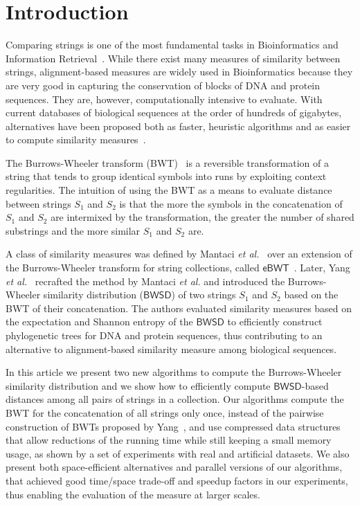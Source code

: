 \documentclass{elsarticle}
\newcommand{\EBWT}{\ensuremath{\mathsf{eBWT}}\xspace}
\newcommand{\etal}{{\it et al.}\xspace}
\newcommand{\BWSD}{\ensuremath{\mathsf{BWSD}}\xspace}
\newcommand{\orange}{\color{orange}}
\begin{document}


\section{Introduction}

{
Comparing strings is one of the most fundamental tasks in
Bioinformatics and Information Retrieval~\cite{Ohlebusch2013,Makinen2015,Baeza2011}.
While there exist many measures of similarity between strings,
alignment-based measures are widely used in Bioinformatics because they
are very good in capturing the conservation of blocks of DNA and protein
sequences.  They are, however, computationally intensive to evaluate.
With current databases of biological sequences at the order of hundreds
of gigabytes, alternatives have been proposed both as faster, heuristic
algorithms and as easier to compute similarity measures~\cite{Pizzi16,ThankachanCLKA17,BelazzouguiC17,NojoomiK17,LinAJJ18}.

The Burrows-Wheeler transform (BWT)~\cite{Burrows1994} is a reversible
transformation of a string that tends to group identical symbols into runs
by exploiting context regularities. The intuition of using the BWT as a
means to evaluate distance between strings $S_1$ and $S_2$ is that the more
the symbols in the concatenation of $S_1$ and $S_2$ are intermixed by the
transformation, the greater the number of shared substrings and the more
similar $S_1$ and $S_2$ are.

A class of similarity measures was defined by Mantaci
\etal~\cite{Mantaci2008b} over an extension of the Burrows-Wheeler
transform for string collections, called \EBWT~\cite{Mantaci2005}.
Later, Yang \etal~\cite{Yang2010a,Yang2010b} recrafted the method by
Mantaci \etal and introduced the Burrows-Wheeler similarity distribution
(\BWSD) of two strings $S_1$ and $S_2$ based on the BWT of their
concatenation.  The authors evaluated similarity measures based on the
expectation and Shannon entropy of the \BWSD to efficiently construct
phylogenetic trees for DNA and protein sequences, thus contributing to an
alternative to alignment-based similarity measure among biological
sequences.
}


In this article we present two new algorithms to compute the
Burrows-Wheeler similarity distribution and we show how to
efficiently compute \BWSD-based distances among all pairs of strings in a
collection.  Our algorithms compute the BWT for the concatenation of all
strings only once, instead of the pairwise construction of BWTs proposed by
Yang~\cite{Yang2010a,Yang2010b}, and use compressed data structures that
allow reductions of the running time while still keeping a small memory
usage, as shown by a set of experiments with real and artificial datasets.
We also present both space-efficient alternatives and parallel versions of our
algorithms, that achieved good time/space trade-off and
speedup factors in our experiments, thus
enabling the evaluation of the measure at larger scales.
\end{document}
